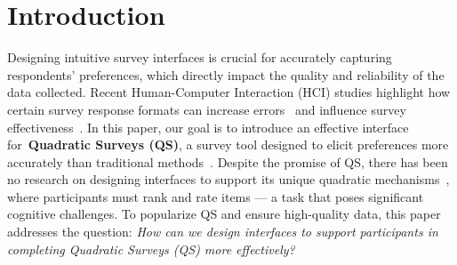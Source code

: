 \section{Introduction}



Designing intuitive survey interfaces is crucial for accurately capturing respondents' preferences, which directly impact the quality and reliability of the data collected. Recent Human-Computer Interaction (HCI) studies highlight how certain survey response formats can increase errors~\cite{pielotDidYouMisclick2024, kimComparingDataChatbot2019} and influence survey effectiveness~\cite{ugur2015evaluating}. In this paper, our goal is to introduce an effective interface for~\textbf{Quadratic Surveys (QS)}, a survey tool designed to elicit preferences more accurately than traditional methods~\cite{chengCanShowWhat2021}. Despite the promise of QS, there has been no research on designing interfaces to support its unique quadratic mechanisms~\cite{grovesOptimalAllocationPublic1977}, where participants must rank and rate items --- a task that poses significant cognitive challenges. To popularize QS and ensure high-quality data, this paper addresses the question: \textit{How can we design interfaces to support participants in completing Quadratic Surveys (QS) more effectively?}

